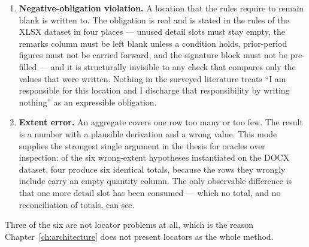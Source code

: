 \begin{enumerate}
    thousands separator in a customs field, a spreadsheet number format leaking into printed
    text, grams reported where kilograms were required, a rounding mode that differs from the
    one the rules specify. This mode is emphatically not a gap in the literature. Mind the Gap
    grades 200 Office tasks against 7,118 machine-gradable criteria and shows that fine-grained
    checking of Word, Excel and PowerPoint artifacts is entirely feasible
    \cite{lv2026mindthegap}, so ``office artifacts admit no machine-checkable oracle'' is not
    available as a claim.
  \item \textbf{Negative-obligation violation.} A location that the rules require to remain
    blank is written to. The obligation is real and is stated in the rules of the XLSX dataset
    in four places --- unused detail slots must stay empty, the remarks column must be left
    blank unless a condition holds, prior-period figures must not be carried forward, and the
    signature block must not be pre-filled --- and it is structurally invisible to any check
    that compares only the values that were written. Nothing in the surveyed literature treats
    ``I am responsible for this location and I discharge that responsibility by writing
    nothing'' as an expressible obligation.
  \item \textbf{Extent error.} An aggregate covers one row too many or too few. The result is
    a number with a plausible derivation and a wrong value. This mode supplies the strongest
    single argument in the thesis for oracles over inspection: of the six wrong-extent
    hypotheses instantiated on the DOCX dataset, four produce six identical totals, because the
    rows they wrongly include carry an empty quantity column. The only observable difference is
    that one more detail slot has been consumed --- which no total, and no reconciliation of
    totals, can see.
\end{enumerate}

Three of the six are not locator problems at all, which is the reason
Chapter~\ref{ch:architecture} does not present locators as the whole method.


